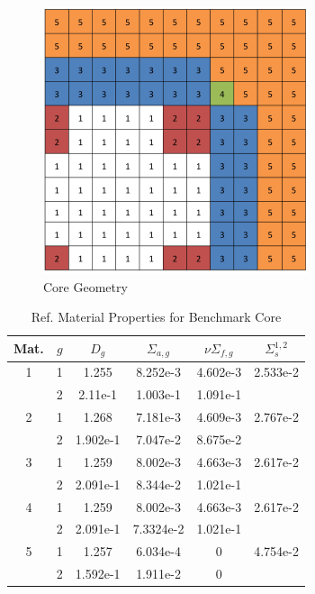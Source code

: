 \documentclass{anstrans} \usepackage{amsmath} \usepackage{amssymb}
\begin{document}
\begin{figure}[H] 
  \centering 
  \includegraphics[width=0.9\linewidth]{../graphics/core}
  \caption{Core Geometry} 
  \label{geom} 
\end{figure} 
  \begin{table}[h] 
    \centering 
    \caption{Ref. Material Properties for Benchmark Core} 
    \begin{tabular}{c c | c c cc} 
      Mat. & $g$ & $D_g$ & $\Sigma_{a,g}$ & $\nu\Sigma_{f,g}$ & $\Sigma_s^{1,2}$ \\ \hline 
      1 & 1 & 1.255 &8.252e-3 & 4.602e-3 & 2.533e-2 \\ 
        & 2 & 2.11e-1 & 1.003e-1 & 1.091e-1 & \\ \hline 
      2 & 1 & 1.268 & 7.181e-3 & 4.609e-3 & 2.767e-2 \\ 
        & 2 & 1.902e-1 & 7.047e-2 & 8.675e-2 & \\ \hline 
      3 & 1 & 1.259 & 8.002e-3 & 4.663e-3 & 2.617e-2 \\ 
        & 2 & 2.091e-1 & 8.344e-2 & 1.021e-1 & \\ \hline 
      4 & 1 & 1.259 & 8.002e-3 & 4.663e-3 & 2.617e-2 \\ 
        & 2 & 2.091e-1 & 7.3324e-2 & 1.021e-1 & \\ \hline 
      5 & 1 & 1.257 & 6.034e-4 & 0 & 4.754e-2 \\ 
        & 2 & 1.592e-1 & 1.911e-2 & 0 & 
      \end{tabular} 
      \label{tab:coremats} 
    \end{table}
\end{document}
